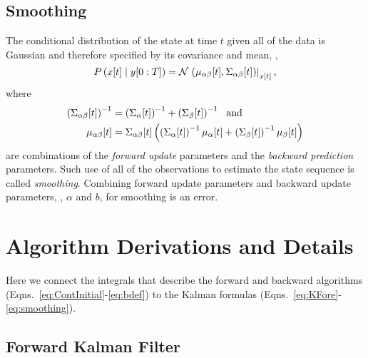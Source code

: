 \subsection{Smoothing}

The conditional distribution of the state at time $t$ given all of the
data is Gaussian and therefore specified by its covariance and mean, \ie,
\begin{equation*}
   P \left({x}{[t]}\mid y[0:T] \right) = {\mathcal{N}}\left.\left({\mu_{\alpha
   \beta}}{[t]},{\Sigma_{\alpha \beta}}{[t]}\right)\right|_{{x}{[t]}},
\end{equation*}
where
\begin{subequations}
  \label{eq:smoothing}
  \begin{align}
    \left( {\Sigma_{\alpha \beta}}{[t]} \right)^{-1} &= \left(
      {\Sigma_{\alpha}}{[t]} \right)^{-1} + \left(
      {\Sigma_{\beta}}{[t]} \right)^{-1} ~\text{ and} \\
    {\mu_{\alpha \beta}}{[t]} &=
    {\Sigma_{\alpha \beta}}{[t]} \left( \left(
        {\Sigma_{\alpha}}{[t]} \right)^{-1} {\mu_{\alpha}}{[t]} +
      \left( {\Sigma_{\beta}}{[t]} \right)^{-1} {\mu_{\beta}}{[t]}
    \right)
\end{align}
\end{subequations}
are combinations of the \emph{forward update} parameters and the
\emph{backward prediction} parameters.  Such use of all of the
observations to estimate the state sequence is called
\emph{smoothing}.  Combining forward update parameters and backward
update parameters, \ie, $\alpha$ and $b$, for smoothing is an error.

\section{Algorithm Derivations and Details}
\label{sec:KDerive}

Here we connect the integrals that describe the forward and backward
algorithms (Eqns.~\eqref{eq:ContInitial}-\eqref{eq:bdef}) to the
Kalman formulas (Eqns.~\eqref{eq:KFore}-\eqref{eq:smoothing}).

\subsection{Forward Kalman Filter}
\label{sec:DetailForward}

